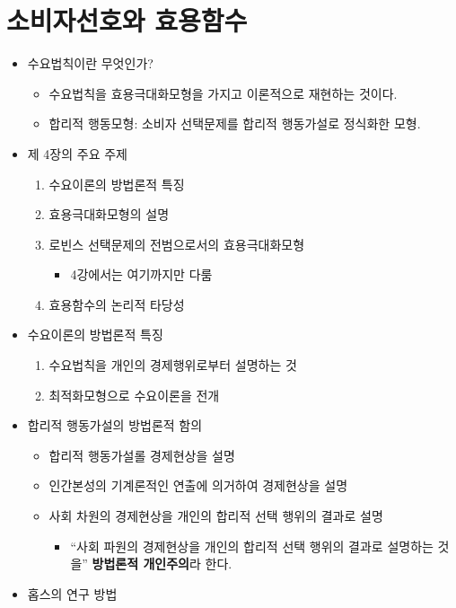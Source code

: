 \documentclass{report}
\begin{document}
\chapter{소비자선호와 효용함수}
\begin{itemize}
    \item 수요법칙이란 무엇인가?
    \begin{itemize}
        \item 수요법칙을 효용극대화모형을 가지고 이론적으로 재현하는 것이다.
        \item 합리적 행동모형: 소비자 선택문제를 합리적 행동가설로 정식화한 모형.
    \end{itemize}
    \item 제 4장의 주요 주제
    \begin{enumerate}
        \item 수요이론의 방법론적 특징
        \item 효용극대화모형의 설명
        \item 로빈스 선택문제의 전범으로서의 효용극대화모형
        \begin{itemize}
            \item 4강에서는 여기까지만 다룸
        \end{itemize}
        \item 효용함수의 논리적 타당성
    \end{enumerate}
    \item 수요이론의 방법론적 특징
    \begin{enumerate}
        \item 수요법칙을 개인의 경제행위로부터 설명하는 것
        \item 최적화모형으로 수요이론을 전개
    \end{enumerate}
    \item 합리적 행동가설의 방법론적 함의
    \begin{itemize}
        \item 합리적 행동가설롤 경제현상을 설명
        \item 인간본성의 기계론적인 연출에 의거하여 경제현상을 설명
        \item 사회 차원의 경제현상을 개인의 합리적 선택 행위의 결과로 설명
        \begin{itemize}
            \item ``사회 파원의 경제현상을 개인의 합리적 선택 행위의 결과로 설명하는 것을'' \textbf{방법론적 개인주의}라 한다.
        \end{itemize}
    \end{itemize}
    \item 홉스의 연구 방법

\end{itemize}
\end{document}
